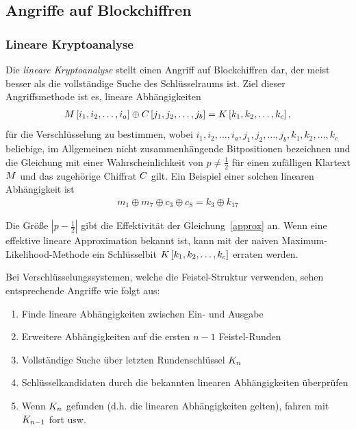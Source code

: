 \subsection{Angriffe auf Blockchiffren}
\subsubsection{Lineare Kryptoanalyse}\label{sssec:linKryptoanalyse}
Die \textit{lineare Kryptoanalyse} stellt einen Angriff auf Blockchiffren dar, der meist besser als die vollständige Suche des Schlüsselraums ist. Ziel dieser Angriffsmethode ist es, lineare Abhängigkeiten
\begin{align}
	M \left[ i_1, i_2, \ldots, i_a \right] \oplus C \left[ j_1, j_2, \ldots, j_b \right]  = K \left[ k_1, k_2, \ldots, k_c \right], \label{approx}
\end{align}
für die Verschlüsselung zu bestimmen, wobei  $i_1, i_2, \ldots, i_a, j_1, j_2, \ldots, j_b,k_1, k_2, \ldots, k_c$ beliebige, im Allgemeinen nicht zusammenhängende Bitpositionen
bezeichnen und die Gleichung mit einer Wahrscheinlichkeit von $p \neq \frac{1}{2}$ für einen zufälligen Klartext $M$ und das zugehörige Chiffrat $C$ gilt. 
Ein Beispiel einer solchen linearen Abhängigkeit ist
\begin{align*}
	m_1 \oplus m_7 \oplus c_3 \oplus c_8 = k_3 \oplus k_{17}
\end{align*}

Die Größe $\left|{p-\frac{1}{2}}\right|$ gibt die Effektivität der Gleichung~\ref{approx} an. Wenn eine effektive lineare Approximation bekannt ist, kann mit der naiven Maximum-Likelihood-Methode ein
Schlüsselbit $K \left[ k_1, k_2, \ldots, k_c \right]$ erraten werden.

Bei Verschlüsselungssystemen, welche die Feistel-Struktur verwenden, sehen entsprechende Angriffe wie folgt aus:
\begin{enumerate}
	\item Finde lineare Abhängigkeiten zwischen Ein- und Ausgabe
	\item Erweitere Abhängigkeiten auf die ersten $n-1$ Feistel-Runden
	\item Vollständige Suche über letzten Rundenschlüssel $K_n$
	\item Schlüsselkandidaten durch die bekannten linearen Abhängigkeiten überprüfen
	\item Wenn $K_n$ gefunden (d.h. die linearen Abhängigkeiten gelten), fahren mit $K_{n-1}$ fort usw.
\end{enumerate}

